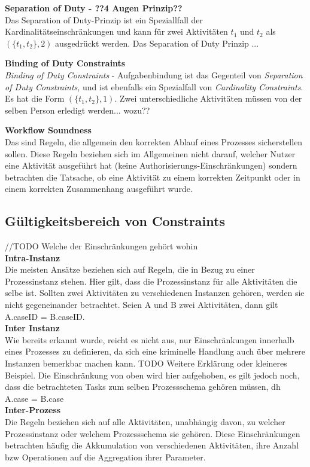 \textbf{Separation of Duty - ??4 Augen Prinzip??}\\
Das Separation of Duty-Prinzip ist ein Speziallfall der Kardinalitätseinschränkungen und kann für zwei Aktivitäten $t_1$ und $t_2$ als $(\{t_1,t_2\},2)$ ausgedrückt werden. Das Separation of Duty Prinzip ...
\cite{SOD}\cite{SOD2}

\textbf{Binding of Duty Constraints}\\
\textit{Binding of Duty Constraints} - Aufgabenbindung ist das Gegenteil von \textit{Separation of Duty Constraints}, und ist ebenfalls ein Spezialfall von \textit{Cardinality Constraints}. Es hat die Form $(\{t_1,t_2\},1)$. Zwei unterschiedliche Aktivitäten müssen von der selben Person erledigt werden... wozu??


\textbf{Workflow Soundness}\\
Das sind Regeln, die allgemein den korrekten Ablauf eines Prozesses sicherstellen sollen. Diese Regeln beziehen sich im Allgemeinen nicht darauf, welcher Nutzer eine Aktivität ausgeführt hat (keine Authorisierungs-Einschränkungen) sondern betrachten die Tatsache, ob eine Aktivität zu einem korrekten Zeitpunkt oder in einem korrekten Zusammenhang ausgeführt wurde.

\subsection{Gültigkeitsbereich von Constraints}
\label{sec:rulecontext}
//TODO Welche der Einschränkungen gehört wohin\\
\textbf{Intra-Instanz}\\
Die meisten Ansätze beziehen sich auf Regeln, die in Bezug zu einer Prozessinstanz stehen. Hier gilt, dass die Prozessinstanz für alle Aktivitäten die selbe ist. Sollten zwei Aktivitäten zu verschiedenen Instanzen gehören, werden sie nicht gegeneinander betrachtet. Seien A und B zwei Aktivitäten, dann gilt A.caseID = B.caseID. 
\\
\textbf{Inter Instanz}\\
Wie bereits erkannt wurde, reicht es nicht aus, nur Einschränkungen innerhalb eines Prozesses zu definieren, da sich eine kriminelle Handlung auch über mehrere Instanzen bemerkbar machen kann. TODO Weitere Erklärung oder kleineres Beispiel. Die Einschränkung von oben wird hier aufgehoben, es gilt jedoch noch, dass die betrachteten Tasks zum selben Prozessschema gehören müssen, dh A.case = B.case
\\
\textbf{Inter-Prozess}\\
Die Regeln beziehen sich auf alle Aktivitäten, unabhängig davon, zu welcher Prozessinstanz oder welchem Prozessschema sie gehören. Diese Einschränkungen betrachten häufig die Akkumulation von verschiedenen Aktivitäten, ihre Anzahl bzw Operationen auf die Aggregation ihrer Parameter.

